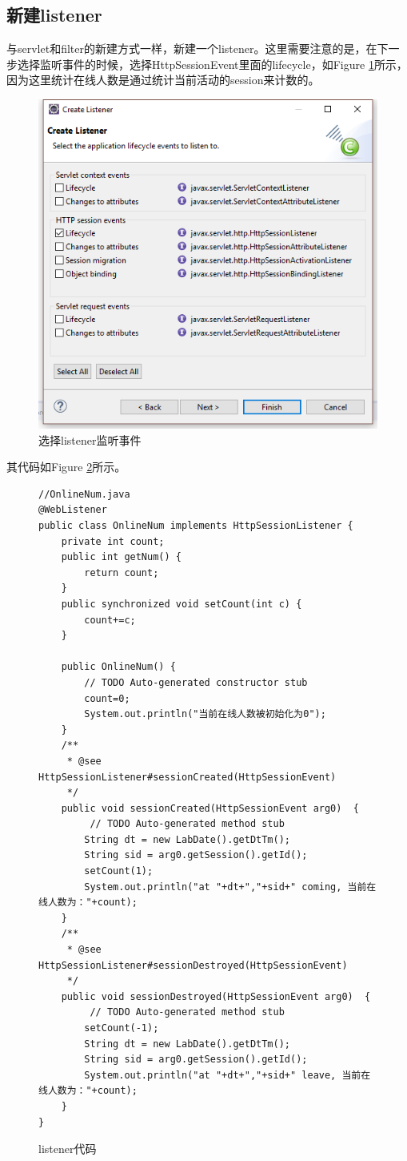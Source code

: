\subsection{新建listener}
与servlet和filter的新建方式一样，新建一个listener。这里需要注意的是，在下一步选择监听事件的时候，选择HttpSessionEvent里面的lifecycle，如Figure \ref{listener}所示，因为这里统计在线人数是通过统计当前活动的session来计数的。
\begin{figure}
\includegraphics[width=1\linewidth]{servletListener.png}
\caption{选择listener监听事件}
\label{listener}

\end{figure}

其代码如Figure \ref{listenercode}所示。
\begin{figure}
\begin{lstlisting}
//OnlineNum.java
@WebListener
public class OnlineNum implements HttpSessionListener {
	private int count;
	public int getNum() {
		return count;
	}	
	public synchronized void setCount(int c) {
		count+=c;
	}

    public OnlineNum() {
        // TODO Auto-generated constructor stub
    	count=0;
    	System.out.println("当前在线人数被初始化为0");
    }
	/**
     * @see HttpSessionListener#sessionCreated(HttpSessionEvent)
     */
    public void sessionCreated(HttpSessionEvent arg0)  { 
         // TODO Auto-generated method stub
    	String dt = new LabDate().getDtTm();
    	String sid = arg0.getSession().getId();
    	setCount(1);
    	System.out.println("at "+dt+","+sid+" coming, 当前在线人数为："+count);
    }
	/**
     * @see HttpSessionListener#sessionDestroyed(HttpSessionEvent)
     */
    public void sessionDestroyed(HttpSessionEvent arg0)  { 
         // TODO Auto-generated method stub
    	setCount(-1);
    	String dt = new LabDate().getDtTm();
    	String sid = arg0.getSession().getId();
    	System.out.println("at "+dt+","+sid+" leave, 当前在线人数为："+count);
    }	
}
\end{lstlisting}
\caption{listener代码}
\label{listenercode}
\end{figure}
